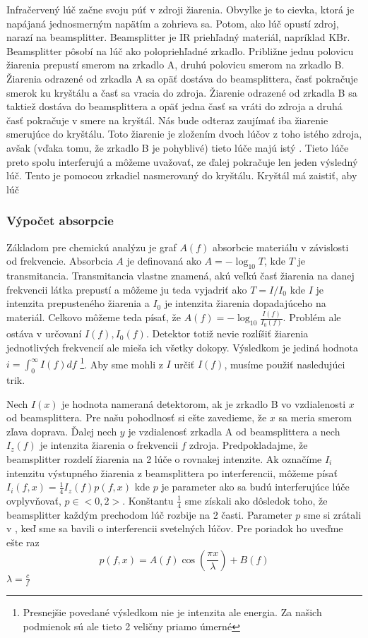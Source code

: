 Infračervený lúč začne svoju púť v zdroji žiarenia. Obvylke je to 
cievka, ktorá je napájaná jednosmerným napätím a zohrieva sa.
Potom, ako lúč opustí zdroj, narazí na beamsplitter. Beamsplitter
je IR priehľadný materiál, napríklad KBr. Beamsplitter pôsobí
na lúč ako polopriehľadné zrkadlo. Približne jednu polovicu žiarenia
prepustí smerom na zrkadlo A, druhú polovicu smerom na zrkadlo B.
Žiarenia odrazené od zrkadla A sa opäť dostáva do beamsplittera,
časť pokračuje smerok ku kryštálu a časť sa vracia do zdroja.
Žiarenie odrazené od zrkadla B sa taktiež dostáva do beamsplittera a
opäť jedna časť sa vráti do zdroja a druhá časť pokračuje v smere na
kryštál. Nás bude odteraz zaujímať iba žiarenie smerujúce do kryštálu.
Toto žiarenie je zložením dvoch lúčov z toho istého zdroja, avšak
(vďaka tomu, že zrkadlo B je pohyblivé) tieto lúče majú istý
. Tieto lúče preto spolu interferujú a môžeme
uvažovať, ze ďalej pokračuje len jeden výsledný lúč.
Tento je pomocou zrkadiel nasmerovaný do kryštálu. Kryštál má zaistiť,
aby lúč


\subsubsection{Výpočet absorpcie}
Základom pre chemickú analýzu je graf $A(f)$ absorbcie materiálu v
závislosti od frekvencie. Absorbcia $A$ je definovaná ako
$A=-\log_{10} T$, kde $T$ je transmitancia. Transmitancia vlastne
znamená, akú veľkú časť žiarenia na danej frekvencii látka prepustí
a môžeme ju teda vyjadriť ako $T=I/I_0$ kde $I$ je intenzita
prepusteného žiarenia a $I_0$ je intenzita žiarenia dopadajúceho na
materiál.
Celkovo môžeme teda písať, že $A(f) = -\log_{10} \frac{I(f)}{I_0(f)}$.
Problém ale ostáva v určovaní $I(f), I_0(f)$. Detektor totiž nevie rozlíšiť
žiarenia jednotlivých frekvencií ale mieša ich všetky dokopy.
Výsledkom je jediná hodnota $i=\int_0^\infty I(f) df$
\footnote{Presnejšie povedané výsledkom nie je intenzita ale energia.
Za našich podmienok sú ale tieto 2 veličny priamo úmerné}.
Aby sme mohli z $I$ určiť $I(f)$, musíme použiť nasledujúci trik.

Nech $I(x)$ je hodnota nameraná detektorom, ak je zrkadlo B vo
vzdialenosti $x$ od beamsplittera. Pre našu pohodlnosť si ešte zavedieme,
že $x$ sa meria smerom zľava doprava. Ďalej nech $y$ je vzdialenosť zrkadla
A od beamsplittera a nech $I_z(f)$ je intenzita žiarenia o frekvencii
$f$ zdroja. Predpokladajme, že beamsplitter rozdelí žiarenia na 2 lúče
o rovnakej intenzite. Ak označíme $I_i$ intenzitu výstupného
žiarenia z beamsplittera po interferencii, môžeme písať
$I_i(f,x)=\frac{1}{4} I_z(f) p(f,x)$ kde $p$ je parameter ako sa budú
interferujúce lúče ovplyvňovať, $p \in <0,2>$. 
Konštantu $\frac{1}{4}$ sme získali ako dôsledok toho, že beamsplitter
každým prechodom lúč rozbije na 2 časti.
Parameter $p$ sme si zrátali v \todo{}, keď sme sa
bavili o interferencii svetelných lúčov. Pre poriadok ho uveďme ešte
raz
\begin{equation}
p(f,x)=A(f) \cos(\frac{\pi x}{\lambda}) + B(f)
\end{equation}
$\lambda=\frac{c}{f}$

